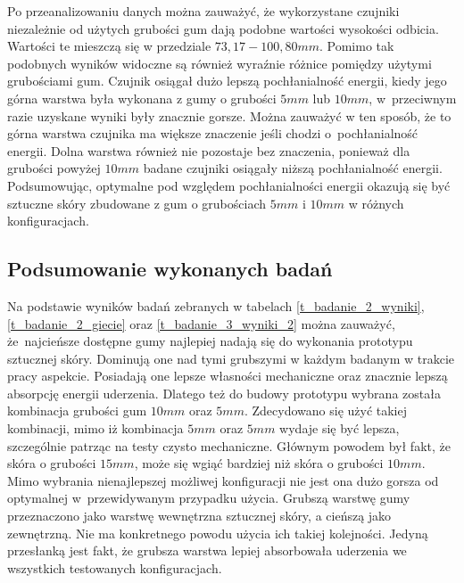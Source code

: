 Po przeanalizowaniu danych można zauważyć, że wykorzystane czujniki niezależnie od użytych grubości gum dają podobne wartości wysokości odbicia. Wartości te mieszczą się w przedziale $73,17-100,80mm$. Pomimo tak podobnych wyników widoczne są również wyraźnie różnice pomiędzy użytymi grubościami gum. Czujnik osiągał dużo lepszą pochłanialność energii, kiedy jego górna warstwa była wykonana z gumy o grubości $5mm$ lub $10mm$, w~przeciwnym razie uzyskane wyniki były znacznie gorsze. Można zauważyć w ten sposób, że to górna warstwa czujnika ma większe znaczenie jeśli chodzi o~pochłanialność energii. Dolna warstwa również nie pozostaje bez znaczenia, ponieważ dla grubości powyżej $10mm$ badane czujniki osiągały niższą pochłanialność energii. Podsumowując, optymalne pod względem pochłanialności energii okazują się być sztuczne skóry zbudowane z gum o grubościach $5mm$ i $10mm$ w różnych konfiguracjach.





\subsection{Podsumowanie wykonanych badań}

Na podstawie wyników badań zebranych w tabelach \ref{t_badanie_2_wyniki}, \ref{t_badanie_2_giecie} oraz \ref{t_badanie_3_wyniki_2} można zauważyć, że~najcieńsze dostępne gumy najlepiej nadają się do wykonania prototypu sztucznej skóry. Dominują one nad tymi grubszymi w każdym badanym w trakcie pracy aspekcie. Posiadają one lepsze własności mechaniczne oraz znacznie lepszą absorpcję energii uderzenia. Dlatego też do budowy prototypu wybrana została kombinacja grubości gum $10 mm$ oraz $5 mm$.
Zdecydowano się użyć takiej kombinacji, mimo iż kombinacja $5 mm$ oraz $5 mm$ wydaje się być lepsza, szczególnie patrząc na testy czysto mechaniczne. Głównym powodem był fakt, że skóra o grubości $15 mm$, może się wgiąć bardziej niż skóra o grubości $10 mm$. Mimo wybrania nienajlepszej możliwej konfiguracji nie jest ona dużo gorsza od optymalnej w~przewidywanym przypadku użycia.
Grubszą warstwę gumy przeznaczono jako warstwę wewnętrzna sztucznej skóry, a cieńszą jako zewnętrzną. Nie ma konkretnego powodu użycia ich takiej kolejności. Jedyną przesłanką jest fakt, że grubsza warstwa lepiej absorbowała uderzenia we wszystkich testowanych konfiguracjach.
